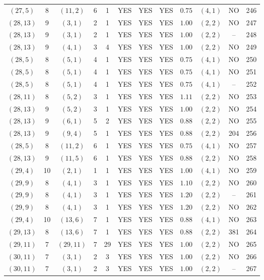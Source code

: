 \begin{longtable}{|c|c|c|c|c|c|c|c|c|c|c|c|}
$(27,5)$ & 8 & $(11,2)$ & 6 & 1 & YES & YES & YES & $0.75$ & $(4,1)$ & NO & 246\\
$(28,13)$ & 9 & $(3,1)$ & 2 & 1 & YES & YES & YES & $1.00$ & $(2,2)$ & NO & 247\\
$(28,13)$ & 9 & $(3,1)$ & 2 & 1 & YES & YES & YES & $1.00$ & $(2,2)$ & -- & 248\\
$(28,13)$ & 9 & $(4,1)$ & 3 & 4 & YES & YES & YES & $1.00$ & $(2,2)$ & NO & 249\\
$(28,5)$ & 8 & $(5,1)$ & 4 & 1 & YES & YES & YES & $0.75$ & $(4,1)$ & NO & 250\\
$(28,5)$ & 8 & $(5,1)$ & 4 & 1 & YES & YES & YES & $0.75$ & $(4,1)$ & NO & 251\\
$(28,5)$ & 8 & $(5,1)$ & 4 & 1 & YES & YES & YES & $0.75$ & $(4,1)$ & -- & 252\\
$(28,11)$ & 8 & $(5,2)$ & 3 & 1 & YES & YES & YES & $1.11$ & $(2,2)$ & NO & 253\\
$(28,13)$ & 9 & $(5,2)$ & 3 & 1 & YES & YES & YES & $1.00$ & $(2,2)$ & NO & 254\\
$(28,13)$ & 9 & $(6,1)$ & 5 & 2 & YES & YES & YES & $0.88$ & $(2,2)$ & NO & 255\\
$(28,13)$ & 9 & $(9,4)$ & 5 & 1 & YES & YES & YES & $0.88$ & $(2,2)$ & 204 & 256\\
$(28,5)$ & 8 & $(11,2)$ & 6 & 1 & YES & YES & YES & $0.75$ & $(4,1)$ & NO & 257\\
$(28,13)$ & 9 & $(11,5)$ & 6 & 1 & YES & YES & YES & $0.88$ & $(2,2)$ & NO & 258\\
$(29,4)$ & 10 & $(2,1)$ & 1 & 1 & YES & YES & YES & $1.00$ & $(4,1)$ & NO & 259\\
$(29,9)$ & 8 & $(4,1)$ & 3 & 1 & YES & YES & YES & $1.10$ & $(2,2)$ & NO & 260\\
$(29,9)$ & 8 & $(4,1)$ & 3 & 1 & YES & YES & YES & $1.20$ & $(2,2)$ & -- & 261\\
$(29,9)$ & 8 & $(4,1)$ & 3 & 1 & YES & YES & YES & $1.20$ & $(2,2)$ & NO & 262\\
$(29,4)$ & 10 & $(13,6)$ & 7 & 1 & YES & YES & YES & $0.88$ & $(4,1)$ & NO & 263\\
$(29,13)$ & 8 & $(13,6)$ & 7 & 1 & YES & YES & YES & $0.88$ & $(2,2)$ & 381 & 264\\
$(29,11)$ & 7 & $(29,11)$ & 7 & 29 & YES & YES & YES & $1.00$ & $(2,2)$ & NO & 265\\
$(30,11)$ & 7 & $(3,1)$ & 2 & 3 & YES & YES & YES & $1.00$ & $(2,2)$ & NO & 266\\
$(30,11)$ & 7 & $(3,1)$ & 2 & 3 & YES & YES & YES & $1.00$ & $(2,2)$ & -- & 267\\

\end{longtable}
